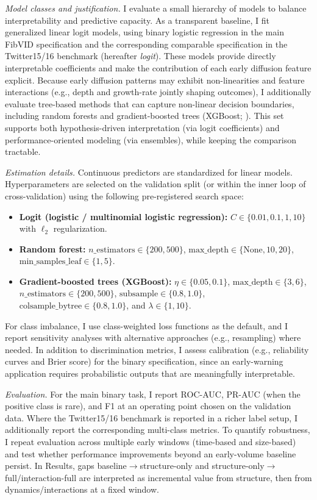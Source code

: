 \emph{Model classes and justification.} I evaluate a small hierarchy of models to balance interpretability and predictive capacity. As a transparent baseline, I fit generalized linear logit models, using binary logistic regression in the main FibVID specification and the corresponding comparable specification in the Twitter15/16 benchmark (hereafter \textit{logit}). These models provide directly interpretable coefficients and make the contribution of each early diffusion feature explicit. Because early diffusion patterns may exhibit non-linearities and feature interactions (e.g., depth and growth-rate jointly shaping outcomes), I additionally evaluate tree-based methods that can capture non-linear decision boundaries, including random forests and gradient-boosted trees (XGBoost; \citealp{chen_xgboost_2016}). This set supports both hypothesis-driven interpretation (via logit coefficients) and performance-oriented modeling (via ensembles), while keeping the comparison tractable.

\emph{Estimation details.} Continuous predictors are standardized for linear models. Hyperparameters are selected on the validation split (or within the inner loop of cross-validation) using the following pre-registered search space:
\begin{itemize}
  \item \textbf{Logit (logistic / multinomial logistic regression):} $C\in\{0.01,0.1,1,10\}$ with $\ell_2$ regularization.
  \item \textbf{Random forest:} $n\_\text{estimators}\in\{200,500\}$, $\text{max\_depth}\in\{\text{None},10,20\}$, $\text{min\_samples\_leaf}\in\{1,5\}$.
  \item \textbf{Gradient-boosted trees (XGBoost):} $\eta\in\{0.05,0.1\}$, $\text{max\_depth}\in\{3,6\}$, $n\_\text{estimators}\in\{200,500\}$, $\text{subsample}\in\{0.8,1.0\}$, $\text{colsample\_bytree}\in\{0.8,1.0\}$, and $\lambda\in\{1,10\}$.
\end{itemize}
For class imbalance, I use class-weighted loss functions as the default, and I report sensitivity analyses with alternative approaches (e.g., resampling) where needed. In addition to discrimination metrics, I assess calibration (e.g., reliability curves and Brier score) for the binary specification, since an early-warning application requires probabilistic outputs that are meaningfully interpretable.

\emph{Evaluation.} For the main binary task, I report ROC-AUC, PR-AUC (when the positive class is rare), and F1 at an operating point chosen on the validation data. Where the Twitter15/16 benchmark is reported in a richer label setup, I additionally report the corresponding multi-class metrics. To quantify robustness, I repeat evaluation across multiple early windows (time-based and size-based) and test whether performance improvements beyond an early-volume baseline persist. In Results, gaps baseline$\rightarrow$structure-only and structure-only$\rightarrow$full/interaction-full are interpreted as incremental value from structure, then from dynamics/interactions at a fixed window.

